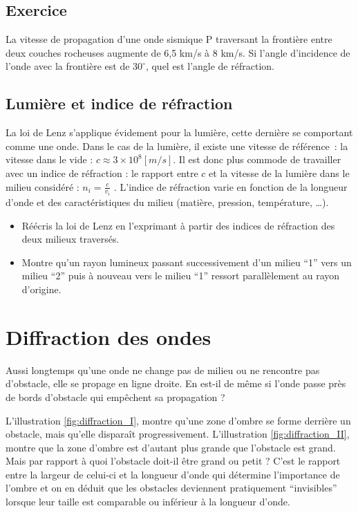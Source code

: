 \subsection{Exercice}
La vitesse de propagation d'une onde sismique P traversant la frontière entre deux couches rocheuses augmente de 6,5 km/s à 8 km/s. Si l'angle d'incidence de l'onde avec la frontière est de \(30^{\circ}\), quel est l'angle de réfraction.

\subsection{Lumière et indice de réfraction}
La loi de Lenz s'applique évidement pour la lumière, cette dernière se comportant comme une onde. Dans le cas de la lumière, il existe une vitesse de référence : la vitesse dans le vide : \(c \approx 3 \times 10^8 [m/s]\). Il est donc plus commode de travailler avec un indice de réfraction : le rapport entre \(c\) et la vitesse de la lumière dans le milieu considéré : \(n_i=\frac{c}{v_i}\) . L'indice de réfraction varie en fonction de la longueur d'onde et des caractéristiques du milieu (matière, pression, température, …).
\begin{itemize}
    \item Réécris la loi de Lenz en l'exprimant à partir des indices de réfraction des deux milieux traversés.
    \item Montre qu'un rayon lumineux passant successivement d'un milieu \enquote{1} vers un milieu \enquote{2} puis à nouveau vers le milieu \enquote{1} ressort parallèlement au rayon d'origine.
\end{itemize}

\newpage

\section{Diffraction des ondes}
Aussi longtemps qu'une onde ne change pas de milieu ou ne rencontre pas d'obstacle, elle se propage en ligne droite. En est-il de même si l'onde passe près de bords d'obstacle qui empêchent sa propagation ?

L'illustration \ref{fig:diffraction_I}, montre qu'une zone d'ombre se forme derrière un obstacle, mais qu'elle disparaît progressivement. L'illustration \ref{fig:diffraction_II}, montre que la zone d'ombre est d'autant plus grande que l'obstacle est grand.
Mais par rapport à quoi l'obstacle doit-il être grand ou petit ? C'est le rapport entre la largeur de celui-ci et la longueur d'onde qui détermine l'importance de l'ombre et on en déduit que les obstacles deviennent pratiquement \enquote{invisibles} lorsque leur taille est comparable ou inférieur à la longueur d'onde.

